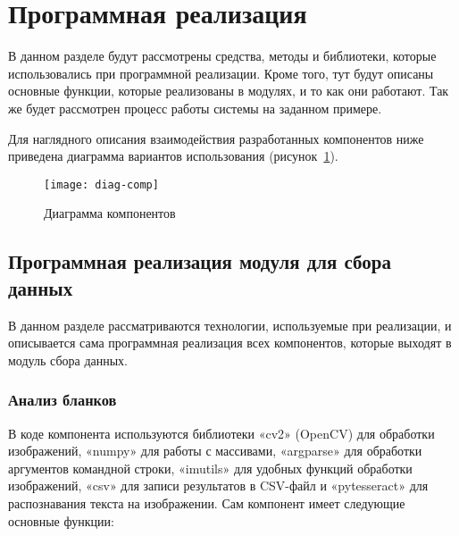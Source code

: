 \newpage

\section{Программная реализация}
В данном разделе будут рассмотрены средства, методы и библиотеки, которые использовались при программной реализации. Кроме того, тут будут описаны основные функции, которые реализованы в модулях, и то как они работают. Так же будет рассмотрен процесс работы системы на заданном примере. 

Для наглядного описания взаимодействия разработанных компонентов ниже приведена диаграмма вариантов использования (рисунок~\ref{f:diag-comp}).

\begin{figure}[h!]
    \centering
    \vspace{\toppaddingoffigure}
    \texttt{[image: diag-comp]}
    \caption{Диаграмма компонентов}
    \label{f:diag-comp}
\end{figure}

\subsection{Программная реализация модуля для сбора данных}

В данном разделе рассматриваются технологии, используемые при реализации, и описывается сама программная реализация всех компонентов, которые выходят в модуль сбора данных.

\subsubsection{Анализ бланков}

В коде компонента используются библиотеки «cv2» (OpenCV) для обработки изображений, «numpy» для работы с массивами, «argparse» для обработки аргументов командной строки, «imutils» для удобных функций обработки изображений, «csv» для записи результатов в CSV-файл и «pytesseract» для распознавания текста на изображении.
Сам компонент имеет следующие основные функции:

